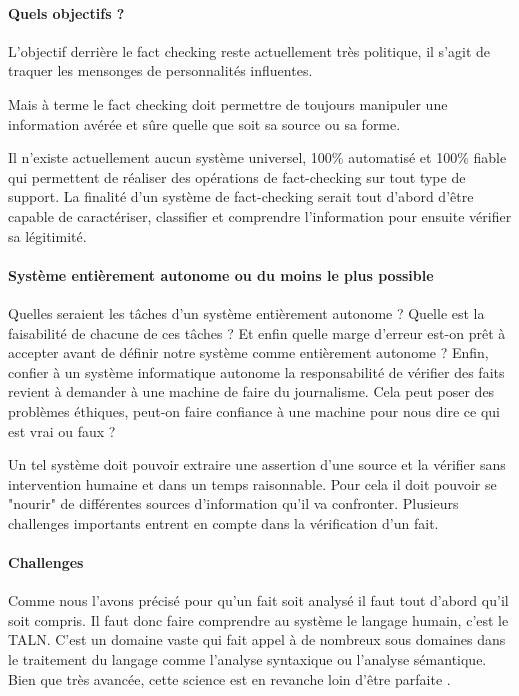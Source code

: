 \paragraph{Quels objectifs ?}

L'objectif derrière le fact checking reste actuellement très politique, il s'agit de traquer les mensonges de personnalités influentes.

Mais à terme le fact checking doit permettre de toujours manipuler une information avérée et sûre quelle que soit sa source ou sa forme.

Il n'existe actuellement aucun système universel, 100\% automatisé et 100\% fiable qui permettent de réaliser des opérations de fact-checking sur tout type de support. La finalité d'un système de fact-checking serait tout d'abord d'être capable de caractériser, classifier et comprendre l'information pour ensuite vérifier sa légitimité. 

\paragraph{Système entièrement autonome ou du moins le plus possible}

Quelles seraient les tâches d'un système entièrement autonome ? Quelle est la faisabilité de chacune de ces tâches ? Et enfin quelle marge d'erreur est-on prêt à accepter avant de définir notre système comme entièrement autonome ? Enfin, confier à un système informatique autonome la responsabilité de vérifier des faits revient à demander à une machine de faire du journalisme. Cela peut poser des problèmes éthiques, peut-on faire confiance à une machine pour nous dire ce qui est vrai ou faux ?

Un tel système doit pouvoir extraire une assertion d'une source et la vérifier sans intervention humaine et dans un temps raisonnable. Pour cela il doit pouvoir se "nourir" de différentes sources d'information qu'il va confronter. Plusieurs challenges importants entrent en compte dans la vérification d'un fait.

\paragraph{Challenges}

Comme nous l'avons précisé pour qu'un fait soit analysé il faut tout d'abord qu'il soit compris. Il faut donc faire comprendre au système le langage humain, c'est le TALN. C'est un domaine vaste qui fait appel à de nombreux sous domaines dans le traitement du langage comme l'analyse syntaxique ou l'analyse sémantique. Bien que très avancée, cette science est en revanche loin d'être parfaite \cite{nlp_not_perfect}.

